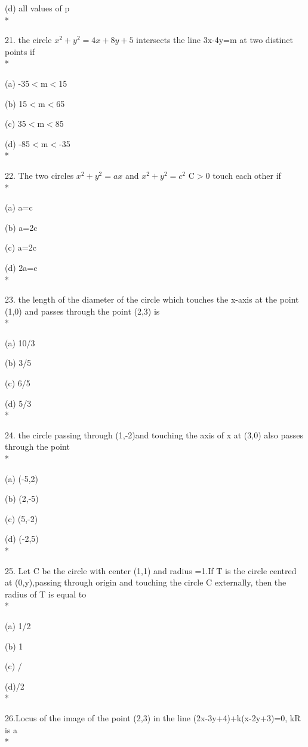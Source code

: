 \documentclass{article}
\begin{document}
\choice (d) all values of p\\*

21. the circle $x^2+y^2=4x+8y+5$ intersects the line 3x-4y=m at two distinct points if\\*

\choice (a) -35$<$m$<$15

\choice (b) 15$<$m$<$65

\choice (c) 35$<$m$<$85

\choice (d) -85$<$m$<$-35\\*

22. The two circles $x^2+y^2=ax$ and $x^2+y^2=c^2$ C$>$0 touch each other if\\*

\choice (a) \mid a\mid=c

\choice(b) a=2c

\choice (c) \mid a\mid=2c

\choice (d) 2\mid a\mid=c\\*

23. the length of the diameter of the circle which touches the x-axis at the point (1,0) and passes through the point (2,3) is \\*

\choice (a) 10/3

\choice (b) 3/5

\choice (c) 6/5

\choice (d) 5/3\\*

24. the circle passing through (1,-2)and touching the axis of x at (3,0) also passes through the point\\*

\choice (a) (-5,2)

\choice (b) (2,-5)

\choice (c) (5,-2)

\choice (d) (-2,5)\\*

25. Let C be the circle with center (1,1) and radius =1.If T is the circle centred at (0,y),passing through origin and touching the circle C externally, then the radius of T is equal to\\*

\choice (a) 1/2

\choice (b) 1\4

\choice (c) /

\choice (d)/2\\*

26.Locus of the image of the point (2,3) in the line (2x-3y+4)+k(x-2y+3)=0, k\in R is a\\*
\end{document}
